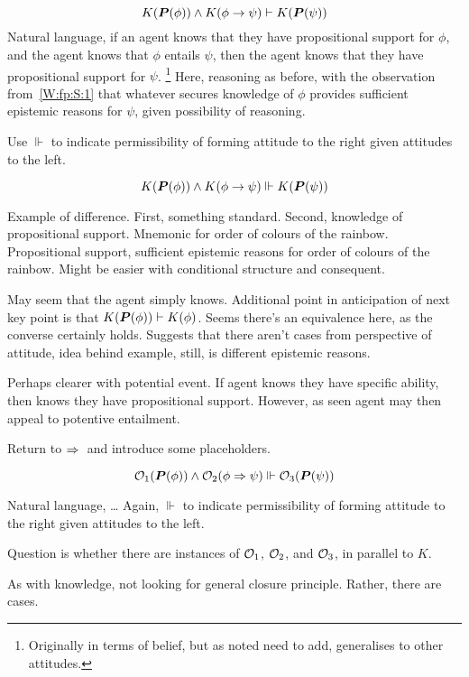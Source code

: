 \begin{note}
  \[K(\bm{P}(\phi)) \land K(\phi \rightarrow \psi) \vdash K(\bm{P}(\psi))\]
  Natural language, if an agent knows that they have propositional support for \(\phi\), and the agent knows that \(\phi\) entails \(\psi\), then the agent knows that they have propositional support for \(\psi\).\nolinebreak
  \footnote{
    Originally in terms of belief, but as noted {\color{red} need to add}, generalises to other attitudes.
  }
  Here, reasoning as before, with the observation from~\ref{W:fp:S:1} that whatever secures knowledge of \(\phi\) provides sufficient epistemic reasons for \(\psi\), given possibility of reasoning.

  Use \(\Vdash\) to indicate permissibility of forming attitude to the right given attitudes to the left.

  \[K(\bm{P}(\phi)) \land K(\phi \rightarrow \psi) \Vdash K(\bm{P}(\psi))\]

  Example of difference.
  First, something standard.
  Second, knowledge of propositional support.
  Mnemonic for order of colours of the rainbow.
  Propositional support, sufficient epistemic reasons for order of colours of the rainbow.
  {
    \color{red}
    Might be easier with conditional structure and consequent.
  }

  May seem that the agent simply knows.
  Additional point in anticipation of next key point is that \(K(\bm{P}(\phi)) \vdash K(\phi)\).
  Seems there's an equivalence here, as the converse certainly holds.
  Suggests that there aren't cases from perspective of attitude,  idea behind example, still, is different epistemic reasons.

  Perhaps clearer with potential event.
  If agent knows they have specific ability, then knows they have propositional support.
  However, as seen agent may then appeal to potentive entailment.
\end{note}

\begin{note}
  Return to \(\Rightarrow{}\) and introduce some placeholders.

  \[\mathcal{O}_{1}(\bm{P}(\phi)) \land \mathcal{O}_{2}(\phi \Rightarrow{} \psi) \Vdash \mathcal{O}_{3}(\bm{P}(\psi))\]

  Natural language, \dots
  Again, \(\Vdash\) to indicate permissibility of forming attitude to the right given attitudes to the left.

  Question is whether there are instances of \(\mathcal{O}_{1}\), \(\mathcal{O}_{2}\), and \(\mathcal{O}_{3}\), in parallel to \(K\).

  As with knowledge, not looking for general closure principle.
  Rather, there are cases.
\end{note}


